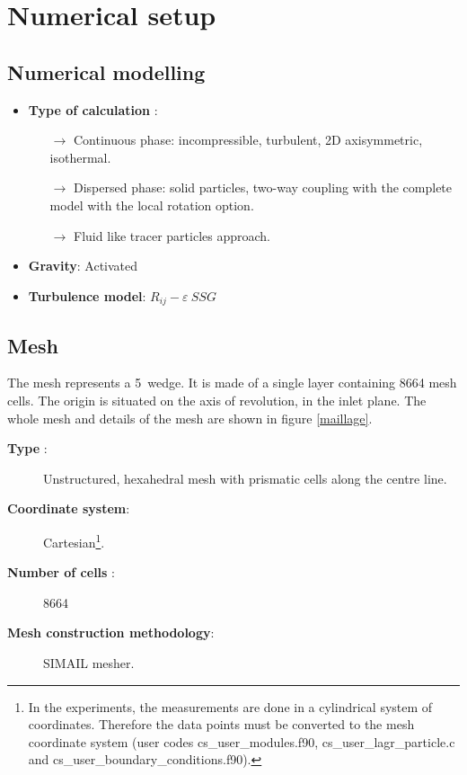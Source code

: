 \section{Numerical setup}

\subsection{Numerical modelling}

\begin{itemize}

   \item \textbf{Type of calculation} :
         \begin{itemize}
            \item[$\rightarrow$] Continuous phase: incompressible, turbulent, 2D axisymmetric, isothermal.
            \item[$\rightarrow$] Dispersed phase: solid particles, two-way coupling with the complete model with the local rotation option.
            \item[$\rightarrow$] Fluid like tracer particles approach.
         \end{itemize}

   \item \textbf{Gravity}: Activated

   \item \textbf{Turbulence model}: $R_{ij}-\varepsilon~SSG$

\end{itemize}

\subsection{Mesh}

The mesh represents a 5\textdegree\ wedge. It is made of a single layer containing 8664 mesh cells. The origin is situated on the axis of revolution, in the inlet plane. The whole mesh and details of the mesh are shown in figure \ref{maillage}.

\begin{description}

   \item[\textbf{Type} :] Unstructured, hexahedral mesh with prismatic cells along the centre line.

   \item[\textbf{Coordinate system}:] Cartesian\footnote{In the experiments, the measurements are done in a cylindrical system of coordinates. Therefore the data points must be converted to the mesh coordinate system (user codes cs\_user\_modules.f90,
            cs\_user\_lagr\_particle.c and cs\_user\_boundary\_conditions.f90).}.

   \item[\textbf{Number of cells} :] 8664

   \item[\textbf{Mesh construction methodology}:] SIMAIL mesher.


\end{description}

